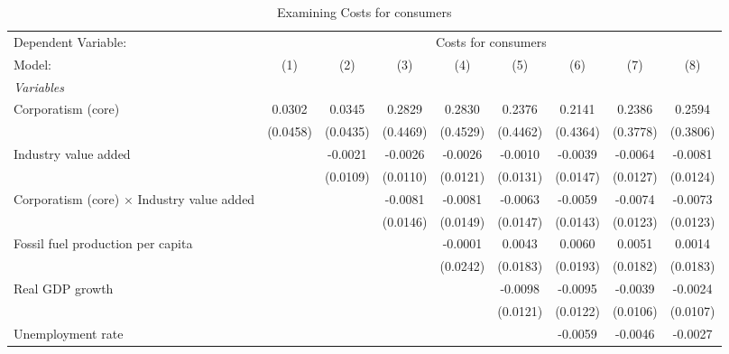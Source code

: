 
\begin{table}[htbp]
   \caption{Examining Costs for consumers}
   \centering
   \begin{tabular}{lcccccccc}
      \tabularnewline \midrule \midrule
      Dependent Variable: & \multicolumn{8}{c}{Costs for consumers}\\
      Model:                                            & (1)      & (2)      & (3)      & (4)      & (5)      & (6)      & (7)      & (8)\\  
      \midrule
      \emph{Variables}\\
      Corporatism (core)                                & 0.0302   & 0.0345   & 0.2829   & 0.2830   & 0.2376   & 0.2141   & 0.2386   & 0.2594\\   
                                                        & (0.0458) & (0.0435) & (0.4469) & (0.4529) & (0.4462) & (0.4364) & (0.3778) & (0.3806)\\   
      Industry value added                              &          & -0.0021  & -0.0026  & -0.0026  & -0.0010  & -0.0039  & -0.0064  & -0.0081\\   
                                                        &          & (0.0109) & (0.0110) & (0.0121) & (0.0131) & (0.0147) & (0.0127) & (0.0124)\\   
      Corporatism (core) $\times$ Industry value added  &          &          & -0.0081  & -0.0081  & -0.0063  & -0.0059  & -0.0074  & -0.0073\\   
                                                        &          &          & (0.0146) & (0.0149) & (0.0147) & (0.0143) & (0.0123) & (0.0123)\\   
      Fossil fuel production per capita                 &          &          &          & -0.0001  & 0.0043   & 0.0060   & 0.0051   & 0.0014\\   
                                                        &          &          &          & (0.0242) & (0.0183) & (0.0193) & (0.0182) & (0.0183)\\   
      Real GDP growth                                   &          &          &          &          & -0.0098  & -0.0095  & -0.0039  & -0.0024\\   
                                                        &          &          &          &          & (0.0121) & (0.0122) & (0.0106) & (0.0107)\\   
      Unemployment rate                                 &          &          &          &          &          & -0.0059  & -0.0046  & -0.0027\\   

\end{tabular}
\end{table}

